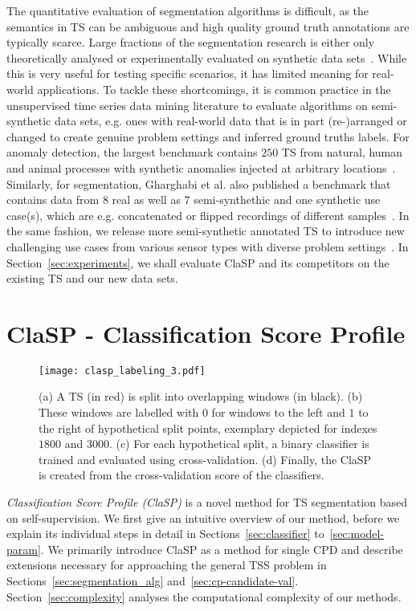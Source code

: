 \documentclass[pdflatex,sn-basic]{sn-jnl}
\begin{document}
The quantitative evaluation of segmentation algorithms is difficult, as the semantics in TS can be ambiguous and high quality ground truth annotations are typically scarce. Large fractions of the segmentation research is either only theoretically analysed or experimentally evaluated on synthetic data sets~\citep{truong2020selective}. While this is very useful for testing specific scenarios, it has limited meaning for real-world applications. To tackle these shortcomings, it is common practice in the unsupervised time series data mining literature to evaluate algorithms on semi-synthetic data sets, e.g. ones with real-world data that is in part (re-)arranged or changed to create genuine problem settings and inferred ground truths labels. For anomaly detection, the largest benchmark contains $250$ TS from natural, human and animal processes with synthetic anomalies injected at arbitrary locations~\citep{KeoghMultiDatasetTADC}. Similarly, for segmentation, Gharghabi et al. also published a benchmark that contains data from $8$ real as well as $7$ semi-synthethic and one synthetic use case(s), which are e.g. concatenated or flipped recordings of different samples~\citep{gharghabi2017matrix}. In the same fashion, we release more semi-synthetic annotated TS to introduce new challenging use cases from various sensor types with diverse problem settings~\citep{TSSBWebpage}. In Section~\ref{sec:experiments}, we shall evaluate ClaSP and its competitors on the existing TS and our new data sets.


\section{ClaSP - Classification Score Profile}\label{sec:clasp_method}

\begin{figure}[t]
    \centering
	\texttt{[image: clasp\_labeling\_3.pdf]}
	\caption{(a) A TS (in red) is split into overlapping windows (in black). (b) These windows are labelled with $0$ for windows to the left and $1$ to the right of hypothetical split points, exemplary depicted for indexes $1800$ and $3000$. (c) For each hypothetical split, a binary classifier is trained and evaluated using cross-validation. (d) Finally, the ClaSP is created from the cross-validation score of the classifiers.
	\label{fig:clasp_labeling}
	}
\end{figure}

\emph{Classification Score Profile (ClaSP)} is a novel method for TS segmentation based on self-supervision. We first give an intuitive overview of our method, before we explain its individual steps in detail in Sections~\ref{sec:classifier} to~\ref{sec:model-param}. We primarily introduce ClaSP as a method for single CPD and describe extensions necessary for approaching the general TSS problem in Sections~\ref{sec:segmentation_alg} and~\ref{sec:cp-candidate-val}. Section~\ref{sec:complexity} analyses the computational complexity of our methods.
\end{document}
